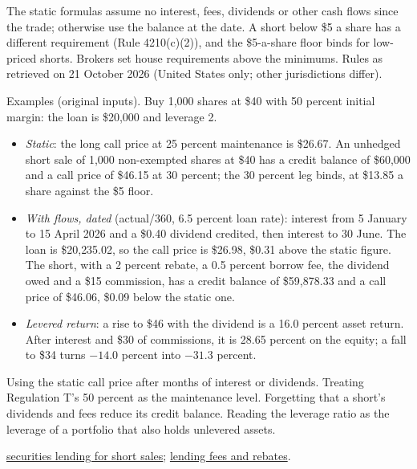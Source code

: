 \begin{qfmethod}
 The static formulas assume no interest, fees, dividends or other cash flows since the trade; otherwise use the balance at the date. A short below \$5 a share has a different requirement (Rule 4210(c)(2)), and the \$5-a-share floor binds for low-priced shorts. Brokers set house requirements above the minimums. Rules as retrieved on 21 October 2026 (United States only; other jurisdictions differ).

 Examples (original inputs). Buy 1{,}000 shares at \$40 with 50 percent initial margin: the loan is \$20{,}000 and leverage 2.
\begin{itemize}
\item \emph{Static}: the long call price at 25 percent maintenance is \$26.67. An unhedged short sale of 1{,}000 non-exempted shares at \$40 has a credit balance of \$60{,}000 and a call price of \$46.15 at 30 percent; the 30 percent leg binds, at \$13.85 a share against the \$5 floor.
\item \emph{With flows, dated} (actual/360, 6.5 percent loan rate): interest from 5 January to 15 April 2026 and a \$0.40 dividend credited, then interest to 30 June. The loan is \$20{,}235.02, so the call price is \$26.98, \$0.31 above the static figure. The short, with a 2 percent rebate, a 0.5 percent borrow fee, the dividend owed and a \$15 commission, has a credit balance of \$59{,}878.33 and a call price of \$46.06, \$0.09 below the static one.
\item \emph{Levered return}: a rise to \$46 with the dividend is a 16.0 percent asset return. After interest and \$30 of commissions, it is 28.65 percent on the equity; a fall to \$34 turns $-14.0$ percent into $-31.3$ percent.
\end{itemize}

 Using the static call price after months of interest or dividends. Treating Regulation T's 50 percent as the maintenance level. Forgetting that a short's dividends and fees reduce its credit balance. Reading the leverage ratio as the leverage of a portfolio that also holds unlevered assets.

 \hyperref[mech:securities-lending-short-sale]{securities lending for short sales}; \hyperref[def:securities-lending-fee-rebate]{lending fees and rebates}.

\end{qfmethod}

